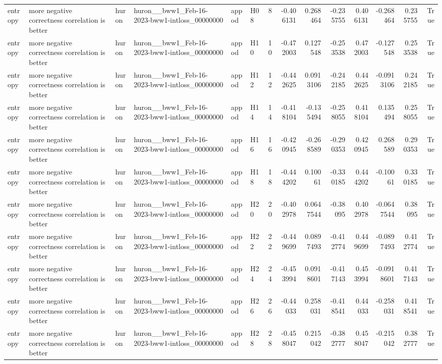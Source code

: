 \begin{longtable}{llllllrrrrrrrr}
entropy & more negative correctness correlation is better & huron & huron\_\_bww1\_Feb-16-2023-bww1-intloss\_00000000 & appod & H08 & 8 & -0.406131 & 0.268464 & -0.235755 & 0.406131 & -0.268464 & 0.235755 & True \\
entropy & more negative correctness correlation is better & huron & huron\_\_bww1\_Feb-16-2023-bww1-intloss\_00000000 & appod & H10 & 10 & -0.472003 & 0.127548 & -0.253538 & 0.472003 & -0.127548 & 0.253538 & True \\
entropy & more negative correctness correlation is better & huron & huron\_\_bww1\_Feb-16-2023-bww1-intloss\_00000000 & appod & H12 & 12 & -0.442625 & 0.0913106 & -0.242185 & 0.442625 & -0.0913106 & 0.242185 & True \\
entropy & more negative correctness correlation is better & huron & huron\_\_bww1\_Feb-16-2023-bww1-intloss\_00000000 & appod & H14 & 14 & -0.418104 & -0.135494 & -0.258055 & 0.418104 & 0.135494 & 0.258055 & True \\
entropy & more negative correctness correlation is better & huron & huron\_\_bww1\_Feb-16-2023-bww1-intloss\_00000000 & appod & H16 & 16 & -0.420945 & -0.268589 & -0.290353 & 0.420945 & 0.268589 & 0.290353 & True \\
entropy & more negative correctness correlation is better & huron & huron\_\_bww1\_Feb-16-2023-bww1-intloss\_00000000 & appod & H18 & 18 & -0.444202 & 0.10061 & -0.330185 & 0.444202 & -0.10061 & 0.330185 & True \\
entropy & more negative correctness correlation is better & huron & huron\_\_bww1\_Feb-16-2023-bww1-intloss\_00000000 & appod & H20 & 20 & -0.402978 & 0.0647544 & -0.38095 & 0.402978 & -0.0647544 & 0.38095 & True \\
entropy & more negative correctness correlation is better & huron & huron\_\_bww1\_Feb-16-2023-bww1-intloss\_00000000 & appod & H22 & 22 & -0.449699 & 0.0897493 & -0.412774 & 0.449699 & -0.0897493 & 0.412774 & True \\
entropy & more negative correctness correlation is better & huron & huron\_\_bww1\_Feb-16-2023-bww1-intloss\_00000000 & appod & H24 & 24 & -0.453994 & 0.0918601 & -0.417143 & 0.453994 & -0.0918601 & 0.417143 & True \\
entropy & more negative correctness correlation is better & huron & huron\_\_bww1\_Feb-16-2023-bww1-intloss\_00000000 & appod & H26 & 26 & -0.44033 & 0.258031 & -0.418541 & 0.44033 & -0.258031 & 0.418541 & True \\
entropy & more negative correctness correlation is better & huron & huron\_\_bww1\_Feb-16-2023-bww1-intloss\_00000000 & appod & H28 & 28 & -0.458047 & 0.215042 & -0.382777 & 0.458047 & -0.215042 & 0.382777 & True \\

\end{longtable}
